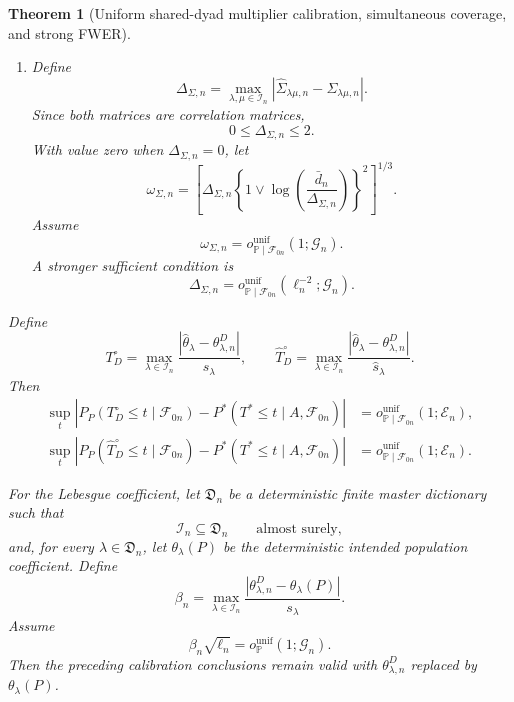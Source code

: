 \documentclass[11pt]{article}
\newtheorem{theorem}{Theorem}[section]
\theoremstyle{definition}
\newcommand{\1}{\mathbf 1}\newcommand{\op}{\operatorname}
\begin{document}
\begin{theorem}[Uniform shared-dyad multiplier calibration,\label{thm:fwer}
simultaneous coverage, and strong FWER]
\begin{enumerate}
\item[(iv)] Define
\[
\Delta_{\Sigma,n}
=
\max_{\lambda,\mu\in\mathcal I_n}
|\widehat\Sigma_{\lambda\mu,n}-\Sigma_{\lambda\mu,n}|.
\]
Since both matrices are correlation matrices,
\[
0\le\Delta_{\Sigma,n}\le2.
\]
With value zero when $\Delta_{\Sigma,n}=0$, let
\begin{equation}
\omega_{\Sigma,n}
=
\left[
\Delta_{\Sigma,n}
\left\{
1\vee
\log\!\left(
\frac{\bar d_n}{\Delta_{\Sigma,n}}
\right)
\right\}^{2}
\right]^{1/3}.
\label{eq:comparison-error}
\end{equation}
Assume
\begin{equation}
\omega_{\Sigma,n}
=
o_{\mathbb P\mid\mathcal F_{0n}}^{\mathrm{unif}}
(1;\mathcal G_n).
\label{eq:covariance-consistency}
\end{equation}
A stronger sufficient condition is
\begin{equation}
\Delta_{\Sigma,n}
=
o_{\mathbb P\mid\mathcal F_{0n}}^{\mathrm{unif}}
(\ell_n^{-2};\mathcal G_n).
\label{eq:simple-covariance-condition}
\end{equation}
\end{enumerate}

Define
\[
T_D^\circ
=
\max_{\lambda\in\mathcal I_n}
\frac{
|\widehat\theta_\lambda-\theta_{\lambda,n}^D|
}{
s_\lambda
},
\qquad
\widehat T_D^\circ
=
\max_{\lambda\in\mathcal I_n}
\frac{
|\widehat\theta_\lambda-\theta_{\lambda,n}^D|
}{
\widehat s_\lambda
}.
\]
Then
\begin{align}
\sup_t
\left|
P_P(T_D^\circ\le t\mid\mathcal F_{0n})
-
P^*(T^*\le t\mid A,\mathcal F_{0n})
\right|
&=
o_{\mathbb P\mid\mathcal F_{0n}}^{\mathrm{unif}}
(1;\mathcal E_n),
\label{eq:oracle-calibration}\\
\sup_t
\left|
P_P(\widehat T_D^\circ\le t\mid\mathcal F_{0n})
-
P^*(T^*\le t\mid A,\mathcal F_{0n})
\right|
&=
o_{\mathbb P\mid\mathcal F_{0n}}^{\mathrm{unif}}
(1;\mathcal E_n).
\label{eq:feasible-calibration}
\end{align}

For the Lebesgue coefficient, let $\mathfrak D_n$ be a deterministic
finite master dictionary such that
\[
\mathcal I_n\subseteq\mathfrak D_n
\qquad\text{almost surely},
\]
and, for every $\lambda\in\mathfrak D_n$, let $\theta_\lambda(P)$
be the deterministic intended population coefficient. Define
\begin{equation}
\beta_n
=
\max_{\lambda\in\mathcal I_n}
\frac{
|\theta_{\lambda,n}^D-\theta_\lambda(P)|
}{
s_\lambda
}.
\label{eq:standardized-target-bias}
\end{equation}
Assume
\begin{equation}
\beta_n\sqrt{\ell_n}
=
o_{\mathbb P}^{\mathrm{unif}}(1;\mathcal G_n).
\label{eq:finite-to-Lebesgue}
\end{equation}
Then the preceding calibration conclusions remain valid with
$\theta_{\lambda,n}^D$ replaced by $\theta_\lambda(P)$.


\end{theorem}
\end{document}
